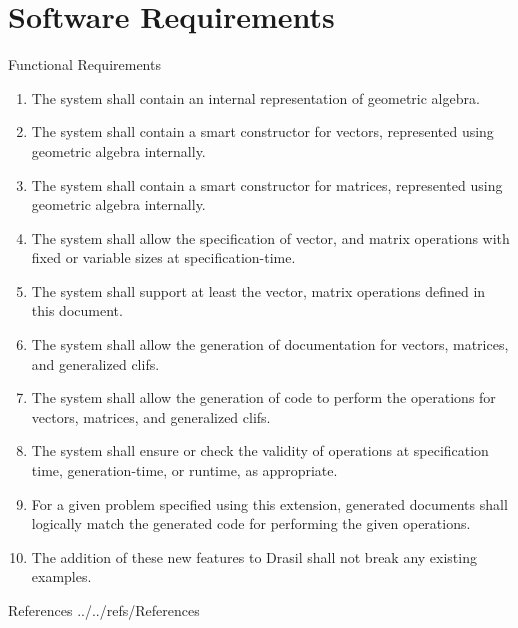 \documentclass[aspectratio=169,xcolor=dvipsnames]{beamer}
\begin{document}
\section{Software Requirements}

\begin{frame}{Functional Requirements}
      \begin{enumerate}
\item<only@1> The system shall contain an internal representation of geometric algebra.
\item<only@1> The system shall contain a smart constructor for vectors, represented using
      geometric algebra internally.
\item<only@1> The system shall contain a smart constructor for matrices, represented using
      geometric algebra internally.
\item<only@1> The system shall allow the specification of vector, and
      matrix operations with fixed or variable sizes at specification-time.
\item<only@1> The system shall support at least the vector, matrix operations
      defined in this document.
\item<only@1> The system shall allow the generation of documentation for vectors, matrices,
      and generalized clifs.
\item<only@1> The system shall allow the generation of code to perform the operations
      for vectors, matrices, and generalized clifs.
\item<only@1> The system shall ensure or check the validity of operations at specification 
      time, generation-time, or runtime, as appropriate.
\item<only@2> For a given problem specified using this extension, generated documents shall 
      logically match the generated code for performing the given operations.
\item<only@2> The addition of these new features to Drasil shall not break any existing
      examples.
      \end{enumerate}
\end{frame}


\begin{frame}{References}
    \tiny
     {../../refs/References}
    
\end{frame}

\end{document}
